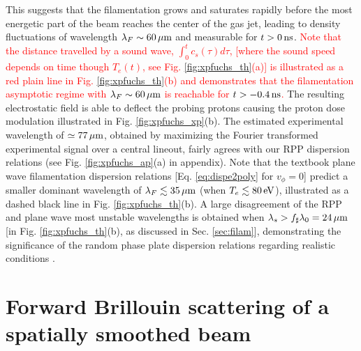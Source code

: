 \documentclass[
 reprint,
 superscriptaddress,
 amsmath,amssymb,
 aps,
]{revtex4-1}
\def\tc{\textcolor{red}}
\begin{document}
This suggests that the filamentation grows and saturates rapidly before the most energetic part of the beam reaches the center of the gas jet, leading to  density fluctuations of wavelength   $\lambda_F \sim 60 \,\rm\mu m$ and measurable for $t>0\,\rm ns$.
\tc{ 
Note that the distance travelled by a sound wave,  $\int_0^t c_s(\tau)d\tau$, 
 [where the sound speed depends on time though $T_e(t)$, see Fig. \ref{fig:xpfuchs_th}(a)] is illustrated as a red plain line in Fig. \ref{fig:xpfuchs_th}(b) and demonstrates that the filamentation asymptotic regime with  $\lambda_F \sim 60 \,\rm\mu m$ is reachable for $t>-0.4 \,\rm ns$. 
 }
The resulting electrostatic field is able to deflect the probing protons   causing the proton dose modulation illustrated in Fig. \ref{fig:xpfuchs_xp}(b). 
The estimated experimental wavelength of $\simeq 77 \,\rm\mu m$, obtained by maximizing the Fourier transformed experimental signal over a central lineout, fairly agrees with our RPP dispersion relations (see Fig. \ref{fig:xpfuchs_ap}(a)  in appendix). 
Note that the textbook plane wave filamentation dispersion relations [Eq. \eqref{eq:dispe2poly} for $v_\phi=0$] predict a  smaller dominant wavelength of $ \lambda_F\lesssim  35\, \rm\mu m$ (when $T_e\lesssim80\, \rm eV$), illustrated as a dashed black line in Fig. \ref{fig:xpfuchs_th}(b). A large disagreement of the  RPP and plane wave most unstable wavelengths is obtained when  $\lambda_s> f_\sharp\lambda_0=24\,\rm\mu m$ [in Fig. \ref{fig:xpfuchs_th}(b), as discussed in Sec. \ref{sec:filam}], demonstrating the significance of the random phase plate dispersion relations regarding realistic conditions \cite[]{Berger_98}.

\section{Forward Brillouin scattering of a  spatially smoothed beam}
\end{document}
